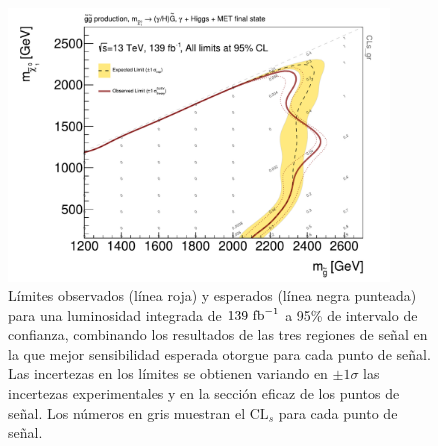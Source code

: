 \begin{figure}[ht!]
  \centering


  \includegraphics[width=0.9\textwidth]{images/results/limits_plots/contour_plot_gHBestSR_wMatplotLib_full.pdf}

  \caption{Límites observados (línea roja) y esperados (línea negra punteada) para una luminosidad integrada de $139\ \text{fb}^{-1}$ a 95\% de intervalo de confianza, combinando los resultados de las tres regiones de señal en la que mejor sensibilidad esperada otorgue para cada punto de señal. Las incertezas en los límites se obtienen variando en $\pm1\sigma$ las incertezas experimentales y en la sección eficaz de los puntos de señal. Los números en gris muestran el $\text{CL}_{s}$ para cada punto de señal.}
  \label{fig:limit_plot_combined}

\end{figure}
